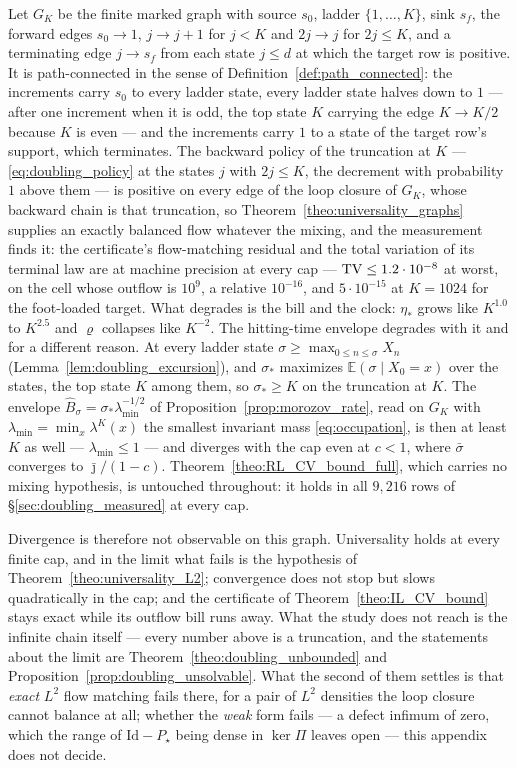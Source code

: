 Let $G_K$ be the finite marked graph with source $s_0$, ladder $\{1,\dots,K\}$, sink $s_f$,
the forward edges $s_0\rightarrow1$, $j\rightarrow j+1$ for $j<K$ and $2j\rightarrow j$ for
$2j\leq K$, and a terminating edge $j\rightarrow s_f$ from each state $j\leq d$ at which the
target row is positive. It is path-connected in the sense of
Definition~\ref{def:path_connected}: the increments carry $s_0$ to every ladder state, every
ladder state halves down to $1$ --- after one increment when it is odd, the top state $K$
carrying the edge $K\rightarrow K/2$ because $K$ is even --- and the increments carry $1$ to a
state of the target row's support, which terminates. The backward policy of the truncation at
$K$ --- \eqref{eq:doubling_policy} at the states $j$ with $2j\leq K$, the decrement with
probability $1$ above them --- is positive on every edge of the loop closure of $G_K$, whose
backward chain is that truncation, so Theorem~\ref{theo:universality_graphs} supplies an
exactly balanced flow whatever the mixing, and the measurement finds it: the certificate's
flow-matching residual and the total variation of its terminal law are at machine precision
at every cap --- $\mathrm{TV}\leq1.2\cdot10^{-8}$ at worst, on the cell whose outflow is $10^9$, a
relative $10^{-16}$, and $5\cdot10^{-15}$ at $K=1024$ for the foot-loaded target. What
degrades is the bill and the clock: $\eta_*$ grows like $K^{1.0}$ to $K^{2.5}$ and $\varrho$
collapses like $K^{-2}$. The hitting-time envelope degrades with it and for a different
reason. At every ladder state $\sigma\geq\max_{0\leq n\leq\sigma}X_n$
(Lemma~\ref{lem:doubling_excursion}), and $\sigma_*$ maximizes $\mathbb E(\sigma\mid X_0=x)$ over the
states, the top state $K$ among them, so $\sigma_*\geq K$ on the truncation at $K$. The
envelope $\widehat B_\sigma=\sigma_*\lambda_{\min}^{-1/2}$ of
Proposition~\ref{prop:morozov_rate}, read on $G_K$ with
$\lambda_{\min}=\min_x\lambda^K(x)$ the smallest invariant mass \eqref{eq:occupation}, is
then at least $K$ as well --- $\lambda_{\min}\leq1$ --- and diverges with the cap even at
$c<1$, where $\bar\sigma$ converges to $\bar\jmath/(1-c)$. Theorem~\ref{theo:RL_CV_bound_full},
which carries no mixing hypothesis, is untouched throughout: it holds in all $9{,}216$ rows
of \S\ref{sec:doubling_measured} at every cap.

Divergence is therefore not observable on this graph. Universality holds at every finite cap,
and in the limit what fails is the hypothesis of Theorem~\ref{theo:universality_L2};
convergence does not stop but slows quadratically in the cap; and the certificate
of Theorem~\ref{theo:IL_CV_bound} stays exact while its outflow bill runs away. What the study
does not reach is the infinite chain itself --- every number above is a truncation, and the
statements about the limit are Theorem~\ref{theo:doubling_unbounded} and
Proposition~\ref{prop:doubling_unsolvable}. What the second of them settles is that
\emph{exact} $L^2$ flow matching fails there, for a pair of $L^2$ densities the loop closure
cannot balance at all; whether the \emph{weak} form fails --- a defect infimum of zero, which
the range of $\mathrm{Id}-P_\star$ being dense in $\ker\Pi$ leaves open --- this appendix does
not decide.

